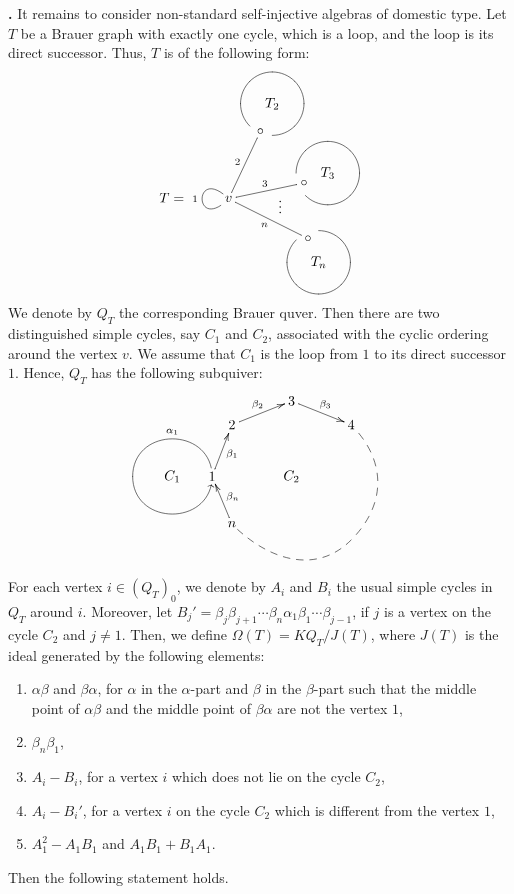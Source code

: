 \documentclass[12pt]{amsart}
\def \para{\refstepcounter{thm} \par\medskip\noindent
                \textbf{\thethm .} }
\numberwithin{equation}{thm}
\begin{document}
{%
\para
It remains to consider non-standard self-injective algebras of domestic type. 
Let $T$ be a Brauer graph with exactly one cycle, which is a loop, and the loop is its direct successor. 
Thus, $T$ is of the following form:
\[ T= \begin{xy}
(0,0)*[o]+{v}="0", (8,17)*[o]+{\circ}="1",
(11,24)*+{T_{2}}*\cir<8mm>{ul_l},
(19,4)*[o]+{\circ}="2", 
(25,6.5)*+{T_{3}}*\cir<8mm>{u_ul},
(13,-1)*[o]+{\vdots}="d1",
(20,-10)*[o]+{\circ}="v1", 
(22.7,-16)*+{T_{n}}*\cir<8mm>{r_ur},
\ar @{-}"0";"1"^{2}
\ar @{-}"0";"2"^{3}
\ar @{-}"0";"v1"_{n}
\ar @{-} @(ul,dl)"0";"0"_{1}
\end{xy} \]
We denote by $Q_T$ the corresponding Brauer quver. Then there are two distinguished simple cycles, say $C_1$ and $C_2$, 
associated with the cyclic ordering around the vertex $v$. 
We assume that $C_1$ is the loop from $1$ to its direct successor $1$. Hence, $Q_T$ has the following subquiver:
\[
\begin{xy}
(0,11)*[o]+{3}="0",(15,5)*[o]+{4}="1", (-15,5)*[oo]+{2}="3",(-20,-8)*[o]+{1}="4",(-40,-8)*{}="damy",
(-15,-20)*[o]+{n}="n",(15,-24)*{}="a",(-30,-8)*{C_1}="c1",(0,-8)*{C_2}="c2",
\ar  "0";"1"^{\beta_3}
\ar  "3";"0"^{\beta_2}
\ar "4";"3"_{\beta_{1}}
\ar "n";"4"_{\beta_{n}}
\ar @{-}@(u,u)"4";"damy"_{\alpha_1}
\SelectTips{eu}{}
\ar @(d,d)"damy";"4"
\ar @{--}@(dr,dl) "n";"a"
\ar @{--}@(ur,dr) "a";"1"
\end{xy}
\]
For each vertex $i\in (Q_T)_0$, we denote by $A_i$ and $B_i$ the usual simple cycles in $Q_T$ around $i$. 
Moreover, let $B_j' = \beta_j\beta_{j+1}\cdots\beta_n\alpha_1\beta_1\cdots\beta_{j-1}$, 
if $j$ is a vertex on the cycle $C_2$ and $j\ne 1$. Then, we define $\Omega(T) = KQ_T/ J(T)$, 
where $J(T)$ is the ideal generated by the following elements:
\begin{enumerate}
\item $\alpha\beta$ and $\beta\alpha$, for $\alpha$ in the $\alpha$-part and $\beta$ in the $\beta$-part 
such that the middle point of $\alpha\beta$ and the middle point of $\beta\alpha$ are not the vertex $1$,
\item $\beta_n\beta_1$,
\item $A_i-B_i$, for a vertex $i$ which does not lie on the cycle $C_2$,
\item $A_i-B_i'$, for a vertex $i$ on the cycle $C_2$ which is different from the vertex $1$,
\item $A_1^2-A_1B_1$ and $A_1B_1+B_1A_1$.
\end{enumerate}
Then the following statement holds.
}
\end{document}
